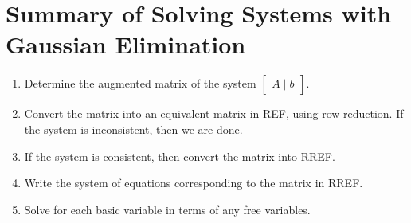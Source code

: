 \documentclass[letterpaper,12pt]{article}
\begin{document}
\section*{Summary of Solving Systems with Gaussian Elimination}
\begin{enumerate}
    \item Determine the augmented matrix of the system $\begin{bmatrix} A \mid b \end{bmatrix}$.
    \item Convert the matrix into an equivalent matrix in REF, using row reduction. If the system is inconsistent, then we are done.
    \item If the system is consistent, then convert the matrix into RREF.
    \item Write the system of equations corresponding to the matrix in RREF.
    \item Solve for each basic variable in terms of any free variables.
\end{enumerate}
\end{document}
